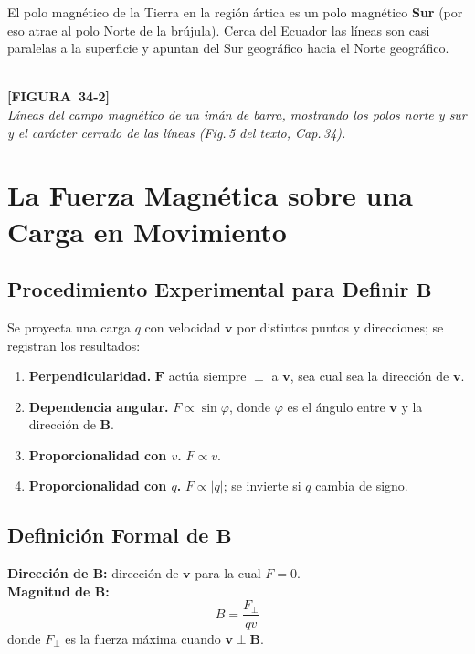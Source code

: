 \documentclass[12pt, letterpaper]{report}
\numberwithin{equation}{section}
\newcommand{\vB}[1]{\boldsymbol{#1}}          %
\newcommand{\figplaceholder}[2]{%
  \begin{tcolorbox}[figbox]
    \centering
    \textcolor{NavyBlue!50}{\rule{0pt}{2.8cm}}\\[4pt]
    {\small\color{NavyBlue}\textbf{[FIGURA\ #1]}\\[2pt]
    \textit{#2}}
  \end{tcolorbox}
}
\begin{document}
\begin{tcolorbox}[notebox, title=Campo magnético terrestre]
  El polo magnético de la Tierra en la región ártica es un polo magnético
  \textbf{Sur} (por eso atrae al polo Norte de la brújula). Cerca del Ecuador
  las líneas son casi paralelas a la superficie y apuntan del Sur geográfico
  hacia el Norte geográfico.
\end{tcolorbox}

\figplaceholder{34-2}{Líneas del campo magnético de un imán de barra, mostrando
los polos norte y sur y el carácter cerrado de las líneas
(Fig.\,5 del texto, Cap.\,34).}

\section{La Fuerza Magnética sobre una Carga en Movimiento}

\subsection{Procedimiento Experimental para Definir \texorpdfstring{$\vB{B}$}{B}}

Se proyecta una carga $q$ con velocidad $\vB{v}$ por distintos puntos y
direcciones; se registran los resultados:

\begin{enumerate}[label=\textbf{Exp.\,\arabic*.},
                  leftmargin=3.2em, itemsep=4pt]
  \item \textbf{Perpendicularidad.} $\vB{F}$ actúa siempre $\perp$ a
        $\vB{v}$, sea cual sea la dirección de $\vB{v}$.
  \item \textbf{Dependencia angular.} $F\propto\sin\varphi$, donde
        $\varphi$ es el ángulo entre $\vB{v}$ y la dirección de $\vB{B}$.
  \item \textbf{Proporcionalidad con $v$.} $F\propto v$.
  \item \textbf{Proporcionalidad con $q$.} $F\propto|q|$; se invierte si
        $q$ cambia de signo.
\end{enumerate}

\subsection{Definición Formal de \texorpdfstring{$\vB{B}$}{B}}

\begin{tcolorbox}[defbox, title=Definición operacional del campo magnético]
  \textbf{Dirección de $\vB{B}$:} dirección de $\vB{v}$ para la cual
  $F=0$.\\[5pt]
  \textbf{Magnitud de $\vB{B}$:}
  \begin{equation}
    \boxed{B = \frac{F_{\perp}}{qv}}
    \label{eq:defB}
  \end{equation}
  donde $F_\perp$ es la fuerza máxima cuando $\vB{v}\perp\vB{B}$.
\end{tcolorbox}
\end{document}
